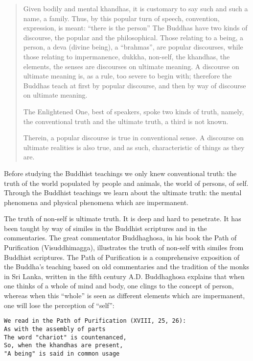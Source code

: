 \documentclass{book}
\begin{document}
\begin{quote}
Given bodily and mental khandhas, it is customary to say such and such a
name, a family. Thus, by this popular turn of speech, convention,
expression, is meant: ``there is the person'' The Buddhas have two kinds
of discourse, the popular and the philosophical. Those relating to a
being, a person, a deva (divine being), a ``brahmas'', are popular
discourses, while those relating to impermanence, dukkha, non-self, the
khandhas, the elements, the senses are discourses on ultimate meaning. A
discourse on ultimate meaning is, as a rule, too severe to begin with;
therefore the Buddhas teach at first by popular discourse, and then by
way of discourse on ultimate meaning.

The Enlightened One, best of speakers, spoke two kinds of truth, namely,
the conventional truth and the ultimate truth, a third is not known.

Therein, a popular discourse is true in conventional sense. A discourse
on ultimate realities is also true, and as such, characteristic of
things as they are.
\end{quote}

Before studying the Buddhist teachings we only knew con­ventional truth:
the truth of the world populated by people and animals, the world of
persons, of self. Through the Buddhist teachings we learn about the
ultimate truth: the mental phenomena and physical phenomena which are
impermanent.

The truth of non-self is ultimate truth. It is deep and hard to
penetrate. It has been taught by way of similes in the Buddhist
scriptures and in the commentaries. The great commentator Buddhaghosa,
in his book the Path of Purification (Visuddhimagga), illustrates the
truth of non-self with similes from Buddhist scriptures. The Path of
Purification is a comprehensive exposition of the Buddha's teaching
based on old commentaries and the tradition of the monks in Sri Lanka,
written in the fifth century A.D. Buddhaghosa explains that when one
thinks of a whole of mind and body, one clings to the concept of person,
whereas when this ``whole'' is seen as different elements which are
impermanent, one will lose the perception of ``self'':

\begin{verbatim}
We read in the Path of Purification (XVIII, 25, 26):
As with the assembly of parts
The word "chariot" is countenanced,
So, when the khandhas are present,
"A being" is said in common usage
\end{verbatim}
\end{document}
